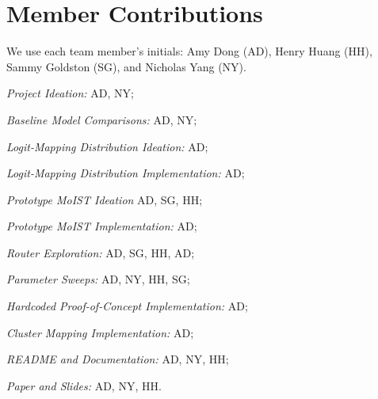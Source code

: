 \documentclass[conference]{IEEEtran}
\begin{document}
\section{Member Contributions}
We use each team member's initials: Amy Dong (AD), Henry Huang (HH), Sammy Goldston (SG), and Nicholas Yang (NY).

\textit{Project Ideation:} AD, NY; 

\textit{Baseline Model Comparisons:} AD, NY; 

\textit{Logit-Mapping Distribution Ideation:} AD; 

\textit{Logit-Mapping Distribution Implementation:} AD; 

\textit{Prototype MoIST Ideation} AD, SG, HH;

\textit{Prototype MoIST Implementation:} AD; 

\textit{Router Exploration:} AD, SG, HH, AD; 

\textit{Parameter Sweeps:} AD, NY, HH, SG; 

\textit{Hardcoded Proof-of-Concept Implementation:} AD;

\textit{Cluster Mapping Implementation:} AD; 

\textit{README and Documentation:} AD, NY, HH;

\textit{Paper and Slides:} AD, NY, HH.

 

\end{document}
